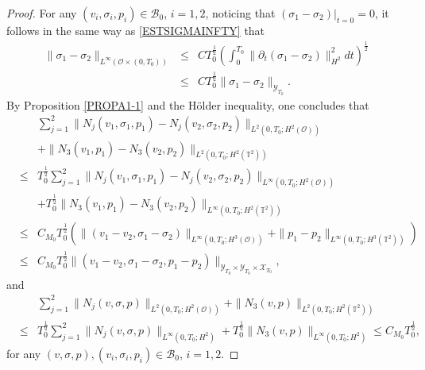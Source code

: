 \documentclass[12pt,reqno]{amsart}
\numberwithin{equation}{section}
\begin{document}
\begin{proof}
For any $(v_i, \sigma_i, p_i)\in\mathscr B_0$, $i=1,2$, noticing that $(\sigma_1-\sigma_2)|_{t=0}=0$, it follows in the same way as \eqref{ESTSIGMAINFTY} that
\begin{eqnarray}
  \|\sigma_1-\sigma_2\|_{L^\infty(\mathcal O\times(0,T_0))}&\leq& CT_0^\frac12\left(\int_0^{T_0}\|\partial_t(\sigma_1-\sigma_2)\|_{H^2}^2dt\right)^\frac12\nonumber\\
  &\leq& CT_0^\frac12\|\sigma_1-\sigma_2\|_{\mathscr Y_{T_0}}. \label{ESTSIGMAINFTYDIFF}
\end{eqnarray}
By Proposition \ref{PROPA1-1} and the H\"older inequality, one concludes that
\begin{eqnarray}
     &&\sum_{j=1}^2\|N_j(v_1,\sigma_1,p_1)-N_j(v_2,\sigma_2,p_2)\|_{L^2(0,T_0; H^2(\mathcal O))}\nonumber\\
     &&+\|N_3(v_1,p_1)-N_3(v_2,p_2)\|_{L^2(0,T_0; H^2(\mathbb T^2))}\nonumber\\
     &\leq&T_0^\frac12\sum_{j=1}^2\|N_j(v_1,\sigma_1,p_1)-N_j(v_2,\sigma_2,p_2)\|_{L^\infty(0,T_0; H^2(\mathcal O))}\nonumber\\
     &&+T_0^\frac12\|N_3(v_1,p_1)-N_3(v_2,p_2)\|_{L^\infty(0,T_0; H^2(\mathbb T^2))}\nonumber\\
     &\leq&C_{M_0}T_0^\frac12\left(\|(v_1-v_2,\sigma_1-\sigma_2)\|_{L^\infty(0,T_0;H^3(\mathcal O))}+\|p_1-p_2\|_{L^\infty(0,T_0;H^3(\mathbb T^2))}\right)\nonumber\\
     &\leq&C_{M_0}T_0^\frac12\|(v_1-v_2,\sigma_1-\sigma_2,p_1-p_2)\|_{\mathscr Y_{T_0}\times\mathscr Y_{T_0}\times
     \mathscr X_{T_0}} ,\label{ESTNDIFF}
\end{eqnarray}
   and
   \begin{eqnarray}\label{ESTNSUM}
   &&\sum_{j=1}^2\|N_j(v,\sigma,p)\|_{L^2(0,T_0; H^2(\mathcal O))}+\|N_3(v,p)\|_{L^2(0,T_0; H^2(\mathbb T^2))}\nonumber\\
   &\leq&T_0^\frac12\sum_{j=1}^2\|N_j(v,\sigma,p)\|_{L^\infty(0,T_0; H^2)}+T_0^\frac12\|N_3(v,p)\|_{L^\infty(0,T_0; H^2)}
   \leq C_{M_0}T_0^\frac12,
   \end{eqnarray}
for any $(v,\sigma, p), (v_i, \sigma_i, p_i)\in\mathscr B_0$, $i=1,2$.



\end{proof}
\end{document}
